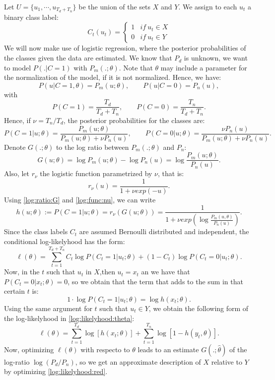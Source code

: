 Let $U = \{u_1,\cdots,u_{T_d + T_n}\}$ be the union of the sets $X$ and $Y$. We assign to each $u_t$ a binary class label:
\[
C_t(u_t) = \begin{cases}
1 & if \ u_t \in X\\
0 & if \ u_t \in Y
\end{cases}
\]
We will now make use of logistic regression, where the posterior probabilities of the classes given the data are estimated. We know that $P_d$ is unknown, we want to model $P(.|C=1)$ with $P_m(.;\theta)$. Note that $\theta$ may include a parameter for the normalization of the model, if it is not normalized. Hence, we have:
\[
P(u|C = 1,\theta) = P_m(u;\theta), \quad \quad P(u|C = 0) = P_n(u),
\]
with
\[
P(C = 1) = \frac{T_d}{T_d + T_n}, \quad \quad P(C = 0) = \frac{T_n}{T_d + T_n}.
\]
Hence, if $\nu = T_n/T_d$, the posterior probabilities for the classes are:
\[
P(C=1|u;\theta) = \frac{P_m(u;\theta)}{P_m(u;\theta) + \nu P_n(u)}, \quad \quad P(C = 0|u; \theta) = \frac{\nu P_n(u)}{P_m(u;\theta) + \nu P_n(u)}.
\]
Denote $G(.;\theta)$ to the log ratio between $P_m(.;\theta)$ and $P_n$:
\begin{equation}\label{log:ratio:G}
G(u;\theta) = \log P_m(u;\theta) - \log P_n(u) = \log \frac{P_m(u;\theta)}{P_n(u)}.
\end{equation}
Also, let $r_\nu$ the logistic function parametrized by $\nu$, that is:
\begin{equation}\label{log:func:nu}
r_\nu(u) = \frac{1}{1 + \nu exp(-u)}.
\end{equation}
Using \ref{log:ratio:G} and \ref{log:func:nu}, we can write
\[
h(u;\theta) := P(C = 1|u ; \theta) =    r_\nu(G(u;\theta)) = \frac{1}{1+ \nu exp(\log \frac{P_m(u,\theta)}{P_n(u)})}. 
\]
Since the class labels $C_t$ are assumed Bernoulli distributed and independent, the conditional log-likelyhood has the form:
\begin{equation}\label{log:likelihood:theta}
\ell(\theta)  = \sum_{t = 1}^{T_d + T_n} C_t \log P(C_t = 1|u_t; \theta) + (1-C_t) \log P(C_t = 0|u_t;\theta).
\end{equation}
Now, in the $t$ such that $u_t$ in $X$,then  $u_t = x_t$ an we have that $P(C_t = 0|x_t;\theta) = 0$, so we obtain that the term that adds to the sum in that certain $t$ is:
\[
1\cdot \log P(C_t = 1|u_t;\theta) = \log h(x_t;\theta).
\]
Using the same argument for $t$ such that $u_t \in Y$, we obtain the following form of the log-likelyhood in \ref{log:likelyhood:theta}:
\begin{equation}\label{log:likelihood:red}
\ell(\theta) = \sum_{t = 1}^{T_d} \log [h(x_t;\theta)] + \sum_{t = 1}^{T_n} \log[1- h(y_t,\theta)].
\end{equation}
Now, optimizing $\ell(\theta)$ with respecto to $\theta$ leads to an estimate $G(.;\hat{\theta})$ of the log-ratio $\log (P_d/P_n)$, so we get an approximate description of $X$ relative to $Y$ by optimizing \ref{log:likelyhood:red}.

